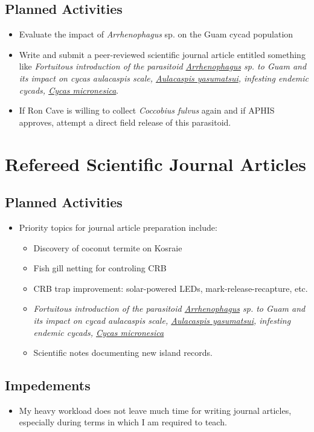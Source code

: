 \documentclass[12pt,oneside,english]{scrbook}
\begin{document}
\subsection{Planned Activities}
\begin{itemize}
\item Evaluate the impact of \textit{Arrhenophagus} sp. on the Guam cycad population
\item Write and submit a peer-reviewed scientific journal article entitled something like \emph{Fortuitous introduction of the parasitoid \underline{Arrhenophagus} sp. to Guam and its impact on cycas aulacaspis scale, \underline{Aulacaspis yasumatsui}, infesting endemic cycads, \underline{Cycas micronesica}}. 
\item If Ron Cave is willing to collect \textit{Coccobius fulvus} again and if APHIS approves, attempt a direct field release of this parasitoid.
\end{itemize}

\section{Refereed Scientific Journal Articles}

\subsection{Planned Activities}
\begin{itemize}
	\item Priority topics for journal article 					preparation include:
	\begin{itemize}
		\item Discovery of coconut termite on Kosraie
		\item Fish gill netting for controling CRB
		\item CRB trap improvement: solar-powered LEDs, mark-release-recapture, etc.
		\item \emph{Fortuitous introduction of the parasitoid \underline{Arrhenophagus} sp. to Guam and its impact on cycad aulacaspis scale, \underline{Aulacaspis yasumatsui}, infesting endemic cycads, \underline{Cycas 				micronesica}} 
		\item Scientific notes documenting new island records.
	\end{itemize}
\end{itemize}

\subsection{Impedements}
\begin{itemize}
\item My heavy workload does not leave much time for writing journal articles, especially during terms in which I am required to teach.
\end{itemize}
\end{document}

